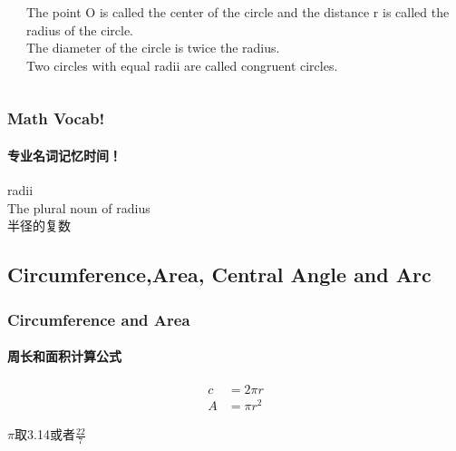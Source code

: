 \documentclass[
	11pt, %
]{beamer}
\begin{document}
\begin{frame}
\begin{columns}[t]
\begin{column}{0.4\textwidth}
				\end{column}
				\begin{column}{0.6\textwidth} %

				\begin{definition}
				The point O is
		called the center of the circle and the distance r is called the radius of the
		circle.\\
		The diameter of the circle is twice the radius.\\
		Two circles with equal radii are called congruent circles.
				\end{definition}
				\end{column}
			\end{columns}

\end{frame}


\begin{frame}
	\frametitle{Math Vocab!} %
	\framesubtitle{专业名词记忆时间！}
	
	{\Huge radii}\\

		\bigskip\bigskip
		{\LARGE The plural noun of radius \\ 
		半径的复数}

\end{frame}




\subsection{Circumference,Area, Central Angle and Arc}
%

\begin{frame}
\frametitle{Circumference and Area}
\framesubtitle{周长和面积计算公式}
\begin{equation*}
\begin{aligned}
	c &= 2\pi r \\
	A &= \pi r^2
\end{aligned}
\end{equation*}

\bigskip\bigskip\bigskip\bigskip
\alert{$\pi$取3.14或者$\frac{22}{7}$}
\end{frame}

\end{document}
